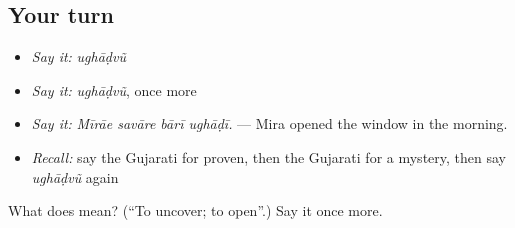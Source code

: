 \subsection*{Your turn}
\begin{itemize}
\raggedright
  \item \emph{Say it:} \emph{ughāḍvũ}
  \item \emph{Say it:} \emph{ughāḍvũ}, once more
  \item \emph{Say it:} \emph{Mīrāe savāre bārī ughāḍī.} — Mira opened the window in the morning.
  \item \emph{Recall:} say the Gujarati for proven, then the Gujarati for a mystery, then say \emph{ughāḍvũ} again
\end{itemize}

\begin{tcolorbox}[breakable,colback=teal!4,colframe=teal!35!black,title={Before you move on}]
What does  mean? (\textquotedblleft{}To uncover; to open\textquotedblright{}.) Say it once more.
\end{tcolorbox}
